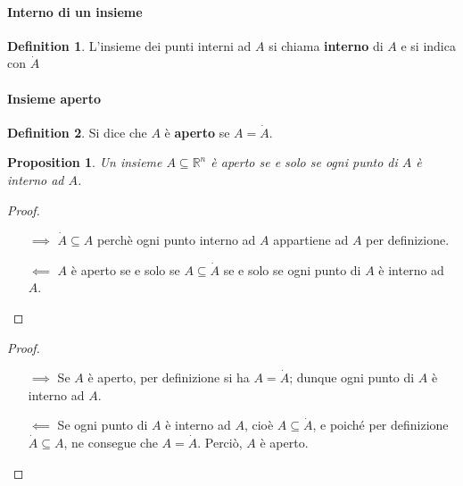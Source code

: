 \documentclass{article}
\theoremstyle{plain}
\newtheorem{prop}[thm]{Proposition}
\theoremstyle{definition}
\newtheorem{defn}{Definition}[section]
\theoremstyle{remark}
\begin{document}
\vspace{10pt}

\paragraph{Interno di un insieme}
\begin{bxthm}
\begin{defn}
    L'insieme dei punti interni ad $A$ si chiama \textbf{interno} di $A$ e si indica con $\dot{A}$ 
\end{defn}
\end{bxthm}

\vspace{10pt}

\paragraph{Insieme aperto}
\begin{bxthm}
\begin{defn}
    Si dice che $A$ è \textbf{aperto} se $A=\dot{A}$.
\end{defn}
\end{bxthm}

\vspace{10pt}

\begin{bxthm}
    \begin{prop}
    Un insieme $A\subseteq\mathbb{R}^n$ è aperto se e solo se ogni punto di $A$ è interno ad $A$.
    \end{prop}
\end{bxthm}
\begin{proof}\hfill
    \begin{itemize}
        \item[$\implies$] $\dot{A}\subseteq A$ perchè ogni punto interno ad $A$ appartiene ad $A$ per definizione. 
        \item[$\impliedby$] $A$ è aperto se e solo se $A\subseteq\dot{A}$ se e solo se ogni punto di $A$ è interno ad $A$.
    \end{itemize}
\end{proof}
\begin{proof}\hfill
\begin{itemize}
    \item[$\implies$] Se $A$ è aperto, per definizione si ha $A=\dot{A}$; dunque ogni punto di $A$ è interno ad $A$.
    \item[$\impliedby$] Se ogni punto di $A$ è interno ad $A$, cioè $A\subseteq\dot{A}$, e poiché per definizione $\dot{A}\subseteq A$, ne consegue che $A=\dot{A}$. Perciò, $A$ è aperto.
\end{itemize}
\end{proof}
\end{document}
